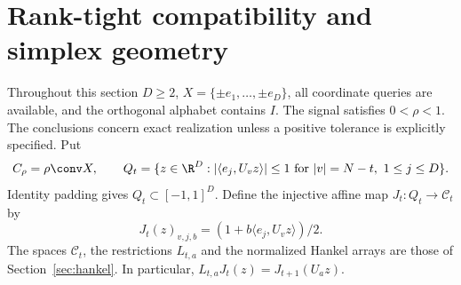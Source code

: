 \section{Rank-tight compatibility and simplex geometry}\label{sec:simplex50}
Throughout this section $D\ge2$, $X=\{\pm e_1,\ldots,\pm e_D\}$,
all coordinate queries are available, and the orthogonal alphabet contains
$I$. The signal satisfies $0<\rho<1$. The conclusions concern exact
realization unless a positive tolerance is explicitly specified. Put
\[
 C_\rho=\rho\conv X,\qquad
 Q_t=\{z\in\R^D:|\langle e_j,U_vz\rangle|\le1
       \text{ for }|v|=N-t,\ 1\le j\le D\}.
\]
Identity padding gives $Q_t\subset[-1,1]^D$. Define the injective affine
map $J_t:Q_t\to\mathcal C_t$ by
\[
 J_t(z)_{v,j,b}=(1+b\langle e_j,U_vz\rangle)/2.
\]
The spaces $\mathcal C_t$, the restrictions $L_{t,a}$ and the normalized
Hankel arrays are those of Section~\ref{sec:hankel}. In particular,
$L_{t,a}J_t(z)=J_{t+1}(U_az)$.

